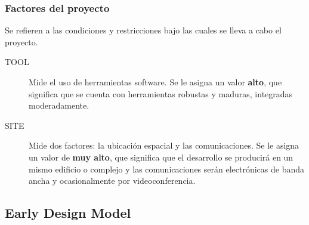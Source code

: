 \documentclass[11pt,a4paper,spanish,twoside]{book}
\begin{document}
\subsubsection{Factores del proyecto}
Se refieren a las condiciones y restricciones bajo las cuales se lleva a cabo
el proyecto.
\begin{description}
\item[TOOL] Mide el uso de herramientas software. Se le asigna un valor
\textbf{alto}, que significa que se cuenta con herramientas robustas y
maduras, integradas moderadamente.
\item[SITE] Mide dos factores: la ubicación espacial y las comunicaciones.
Se le asigna un valor de \textbf{muy alto}, que significa que el desarrollo
se producirá en un mismo edificio o complejo y las comunicaciones serán
electrónicas de banda ancha y ocasionalmente por videoconferencia.
\end{description}

\subsection{Early Design Model}
\end{document}
